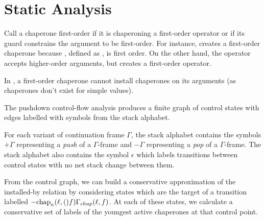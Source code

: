 \documentclass{sigplanconf}
\begin{document}
\section{Static Analysis}




Call a chaperone first-order if it is chaperoning a first-order operator or if its guard constrains the argument to be first-order.
For instance,  creates a first-order chaperone because , defined as , is first order.
On the other hand, the operator  accepts higher-order arguments, but  creates a first-order operator.

In \chapcalc, a first-order chaperone cannot install chaperones on its arguments (as chaperones don't exist for simple values).

The pushdown control-flow analysis produces a finite graph of control states with edges labelled with symbols from the stack alphabet.

For each variant of continuation frame $\Gamma$, the stack alphabet contains the symbols $+\Gamma$ representing a \emph{push} of a $\Gamma$-frame and $-\Gamma$ representing a \emph{pop} of a $\Gamma$-frame.
The stack alphabet also contains the symbol $\epsilon$ which labels transitions between control states with no net stack change between them.

From the control graph, we can build a conservative approximation of the installed-by relation by considering states which are the target of a transition labelled $-\mathrm{chap}_\kappa(\ell,()f)\Gamma_{chap}(\ell,f)$.
At each of these states, we calculate a conservative set of labels of the youngest active chaperones at that control point.
\end{document}
